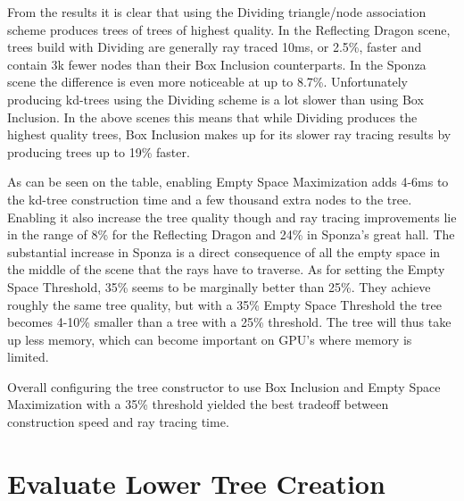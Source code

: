 From the results it is clear that using the Dividing triangle/node association
scheme produces trees of trees of highest quality. In the Reflecting Dragon
scene, trees build with Dividing are generally ray traced 10ms, or 2.5\%, faster
and contain 3k fewer nodes than their Box Inclusion counterparts. In the Sponza
scene the difference is even more noticeable at up to 8.7\%. Unfortunately
producing kd-trees using the Dividing scheme is a lot slower than using Box
Inclusion. In the above scenes this means that while Dividing produces the
highest quality trees, Box Inclusion makes up for its slower ray tracing results
by producing trees up to 19\% faster.

As can be seen on the table, enabling Empty Space Maximization adds 4-6ms to the
kd-tree construction time and a few thousand extra nodes to the tree. Enabling
it also increase the tree quality though and ray tracing improvements lie in the
range of 8\% for the Reflecting Dragon and 24\% in Sponza's great hall. The
substantial increase in Sponza is a direct consequence of all the empty space in
the middle of the scene that the rays have to traverse. As for setting the Empty
Space Threshold, 35\% seems to be marginally better than 25\%. They achieve
roughly the same tree quality, but with a 35\% Empty Space Threshold the tree
becomes 4-10\% smaller than a tree with a 25\% threshold. The tree will thus
take up less memory, which can become important on GPU's where memory is
limited.

Overall configuring the tree constructor to use Box Inclusion and Empty Space
Maximization with a 35\% threshold yielded the best tradeoff between
construction speed and ray tracing time.

\section{Evaluate Lower Tree Creation}\label{sec:evaluateLowerTree}



